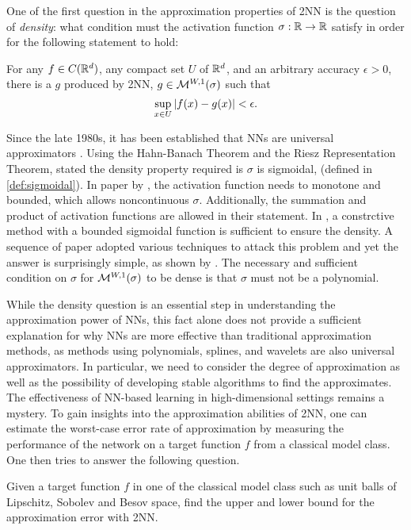
One of the first question in the approximation properties of 2NN is the question
of \textit{density}: what condition must the activation function $\sigma: \mathbb{R} \to \mathbb{R}$
satisfy in order for the following statement to hold:

For any $f \in C(\mathbb{R}^d)$, any compact set $U$ of $\mathbb{R}^d$, and an arbitrary
accuracy $\epsilon > 0$, there is a $g$ produced by 2NN, $g \in
\mathcal{M}^{ {W}, {1} }( {\sigma} )$ such that 
\begin{equation*}
    \sup_{x \in U} \left| f(x) - g(x) \right| < \epsilon.
\end{equation*}

Since the late 1980s, it has been established that NNs are universal
approximators \citep{carrollConstructionNeuralNets1989,
cybenkoApproximationSuperpositionsSigmoidal1989,
hornikMultilayerFeedforwardNetworks1989a,
funahashiApproximateRealizationContinuous1989}. Using the Hahn-Banach Theorem
and the Riesz Representation Theorem,
\cite{cybenkoApproximationSuperpositionsSigmoidal1989} stated the density
property required is $\sigma$ is sigmoidal, (defined in \eqref{def:sigmoidal}).
In paper by \cite{hornikMultilayerFeedforwardNetworks1989a}, the activation
function needs to monotone and bounded, which allows noncontinuous $\sigma$.
Additionally, the summation and product of activation functions are allowed in
their statement. In \cite{jonesSimpleLemmaGreedy1992}, a constrctive method with
a bounded sigmoidal function is sufficient to ensure the density. A sequence of
paper adopted various techniques to attack this problem and yet the answer is
surprisingly simple, as shown by \cite{leshnoMultilayerFeedforwardNetworks1993}.
The necessary and sufficient condition on $\sigma$ for $\mathcal{M}^{ {W}, {1} }( {\sigma} )$
to be dense is that $\sigma$ must not be a polynomial. 


While the density question is an essential step in understanding the
approximation power of NNs, this fact alone does not provide a sufficient
explanation for why NNs are more effective than traditional approximation
methods, as methods using polynomials, splines, and wavelets are also universal
approximators. In particular, we need to consider the degree of approximation as
well as the possibility of developing stable algorithms to find the
approximates. The effectiveness of NN-based learning in high-dimensional
settings remains a mystery. To gain insights into the approximation abilities of
2NN, one can estimate the worst-case error rate of approximation by measuring
the performance of the network on a target function $f$ from a classical model
class. One then tries to answer the following question.
\begin{problem}
    \label{problem:1}
    Given a target function $f$ in one of the classical model class such as unit
    balls of Lipschitz, Sobolev and Besov space, find the upper and lower bound
    for the approximation error with 2NN. 
\end{problem}

